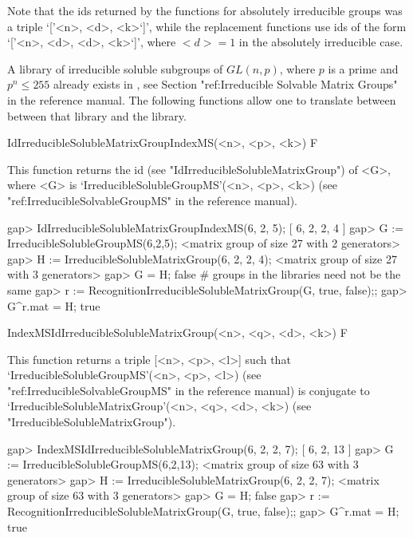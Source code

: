Note that the ids returned by the functions for absolutely irreducible groups was a triple `['<n>, <d>, <k>`]', while the replacement functions use ids of the form `['<n>, <d>, <d>, <k>`]', where $<d> = 1$ in the absolutely irreducible case.



A library of irreducible soluble subgroups of $GL(n, p)$, where $p$ is a 
prime and $p^n \leq 255$ already exists in {\GAP}, see Section "ref:Irreducible Solvable Matrix Groups" in the {\GAP} reference manual. The following functions
allow one to translate between between that library and the {\IRREDSOL} library. 


\>IdIrreducibleSolubleMatrixGroupIndexMS(<n>, <p>, <k>) F

This function returns the id (see "IdIrreducibleSolubleMatrixGroup") of <G>, 
where <G> is `IrreducibleSolubleGroupMS'(<n>, <p>, <k>) (see "ref:IrreducibleSolvableGroupMS" in the {\GAP} reference manual).

\beginexample
gap> IdIrreducibleSolubleMatrixGroupIndexMS(6, 2, 5);
[ 6, 2, 2, 4 ]
gap> G := IrreducibleSolubleGroupMS(6,2,5);
<matrix group of size 27 with 2 generators>
gap> H := IrreducibleSolubleMatrixGroup(6, 2, 2, 4);
<matrix group of size 27 with 3 generators>
gap> G = H;
false 
# groups in the libraries need not be the same
gap> r := RecognitionIrreducibleSolubleMatrixGroup(G, true, false);;
gap> G^r.mat = H;
true
\endexample

\>IndexMSIdIrreducibleSolubleMatrixGroup(<n>, <q>, <d>, <k>) F

This function returns a triple [<n>, <p>, <l>] such that
`IrreducibleSolubleGroupMS'(<n>, <p>, <l>) (see "ref:IrreducibleSolvableGroupMS" in the {\GAP} reference manual) is conjugate to
`IrreducibleSolubleMatrixGroup'(<n>, <q>, <d>, <k>) (see "IrreducibleSolubleMatrixGroup").

\beginexample
gap> IndexMSIdIrreducibleSolubleMatrixGroup(6, 2, 2, 7);
[ 6, 2, 13 ]
gap> G := IrreducibleSolubleGroupMS(6,2,13);
<matrix group of size 63 with 3 generators>
gap> H := IrreducibleSolubleMatrixGroup(6, 2, 2, 7);
<matrix group of size 63 with 3 generators>
gap> G = H;
false 
gap> r := RecognitionIrreducibleSolubleMatrixGroup(G, true, false);;
gap> G^r.mat = H;
true
\endexample



